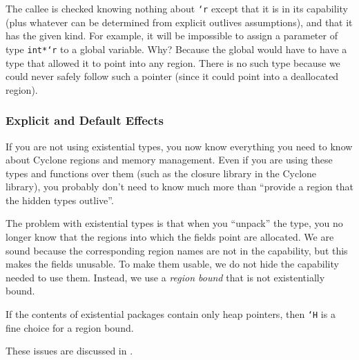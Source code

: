 The callee is checked knowing nothing about \texttt{`r} except that it is in
its capability (plus whatever can be determined from explicit outlives
assumptions), and that it has the given kind.  For example, it will be
impossible to assign a parameter of type \texttt{int*`r} to a global
variable.  Why?  Because the global would have to have a type that allowed
it to point into any region.  There is no such type because we could never
safely follow such a pointer (since it could point into a deallocated
region).

\subsubsection{Explicit and Default Effects}

If you are not using existential types, you now know everything you
need to know about Cyclone regions and memory management.  Even if you
are using these types and functions over them (such as the closure
library in the Cyclone library), you probably don't need to know much more
than ``provide a region that the hidden types outlive''.

The problem with existential types is that when you ``unpack'' the
type, you no longer know that the regions into which the fields point
are allocated.  We are sound because the corresponding region names
are not in the capability, but this makes the fields unusable.  To
make them usable, we do not hide the capability needed to use them.
Instead, we use a \emph{region bound} that is not existentially
bound.  

If the contents of existential packages contain only heap pointers,
then \texttt{`H} is a fine choice for a region bound.

These issues are discussed in .




